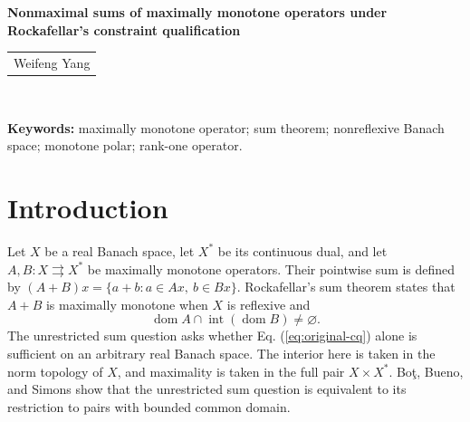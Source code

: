 \documentclass[11pt]{article}
\newcommand{\dom}{\operatorname{dom}}
\theoremstyle{definition}
\theoremstyle{remark}
\begin{document}
\begin{center}
{\Large\bfseries Nonmaximal sums of maximally monotone operators under Rockafellar’s constraint qualification}\\[10pt]
\begin{tabular}{c}
Weifeng Yang\footnotemark
\end{tabular}\\[10pt]
\end{center}


\begin{abstract}


We construct counterexamples to Rockafellar's sum conjecture in which two maximally monotone operators satisfy the interior-domain condition but their sum is not maximally monotone. We give one counterexample on $c_0$ and another on $\ell^1$ with its usual norm.
We establish a general construction theorem that computes the entire monotone polar of a class of graphs, gives a necessary and sufficient condition for their maximal monotonicity, and shows how a positive rank-one perturbation produces a nonmaximal sum under this condition. By coupling triangular operators with a Lipschitz curve, we verify the theorem's hypotheses and its maximality criterion on $c_0$, thereby obtaining a counterexample to the conjecture. We then construct a bounded linear surjection from $\ell^1$ onto $c_0$ and use it to obtain the counterexample on $\ell^1$.





\end{abstract}


\noindent\textbf{Keywords:} maximally monotone operator; sum theorem;
nonreflexive Banach space; monotone polar; rank-one operator.

\section{Introduction}
\label{sec:introduction}
Let $X$ be a real Banach space, let $X^*$ be its continuous dual, and let $A,B:X\rightrightarrows X^*$ be maximally monotone operators. Their pointwise sum is defined by $(A+B)x=\{a+b:a\in Ax,\ b\in Bx\}$. Rockafellar's sum theorem \cite{rockafellar1970} states that $A+B$ is maximally monotone when $X$ is reflexive and
\begin{equation}
\dom A\cap\operatorname{int}(\dom B)\ne\varnothing.
\label{eq:original-cq}
\end{equation}
The unrestricted sum question asks whether Eq. (\ref{eq:original-cq}) alone is sufficient on an arbitrary real Banach space. The interior here is taken in the norm topology of $X$, and maximality is taken in the full pair $X\times X^*$. Bo\c{t}, Bueno, and Simons \cite{botbuenosimons2016} show that the unrestricted sum question is equivalent to its restriction to pairs with bounded common domain.
\end{document}
